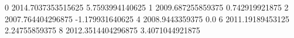 0 2014.7037353515625 5.7593994140625
1 2009.687255859375 0.742919921875
2 2007.764404296875 -1.179931640625
4 2008.9443359375 0.0
6 2011.19189453125 2.24755859375
8 2012.3514404296875 3.4071044921875
